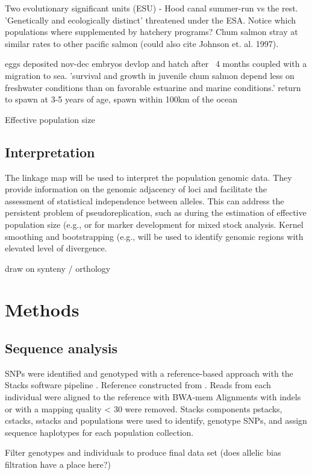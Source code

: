 \documentclass[12pt,  one column]{article}
\begin{document}
Two evolutionary significant units (ESU) - Hood canal summer-run vs the rest. 'Genetically and ecologically distinct' threatened under the ESA. Notice which populations where supplemented by hatchery programs?
Chum salmon stray at similar rates to other pacific salmon \cite{Small2014} (could also cite Johnson et. al. 1997).

eggs deposited nov-dec
embryos devlop and hatch after ~4 months coupled with a migration to sea. 'survival and growth in juvenile chum salmon depend less on freshwater conditions than on favorable estuarine and marine conditions.'
return to spawn at 3-5 years of age, spawn within 100km of the ocean

Effective population size

\subsection*{Interpretation}
The linkage map will be used to interpret the population genomic data. They provide information on the genomic adjacency of loci and facilitate the  assessment of statistical independence between alleles.  This can address the persistent problem of pseudoreplication, such as during the estimation of effective population size (e.g., \citet{Larson2014} or for marker development for mixed stock analysis. Kernel smoothing and bootstrapping (e.g., \citet{Hohenlohe2010} will be used to identify genomic regions with elevated level of divergence.

draw on synteny / orthology 

\section*{Methods}

\subsection*{Sequence analysis}
SNPs were identified and genotyped with a reference-based approach with the Stacks software pipeline \cite{Catchen2013}.  Reference constructed from \citet{Waples2015}. Reads from each individual were aligned to the reference with BWA-mem  \citep{Li2013}  Alignments with indels or with a mapping quality < 30 were removed. Stacks components pstacks, cstacks, sstacks and populations were used to identify, genotype SNPs, and assign sequence haplotypes for each population collection.  

Filter genotypes and individuals to produce final data set (does allelic bias filtration have a place here?)
\end{document}
